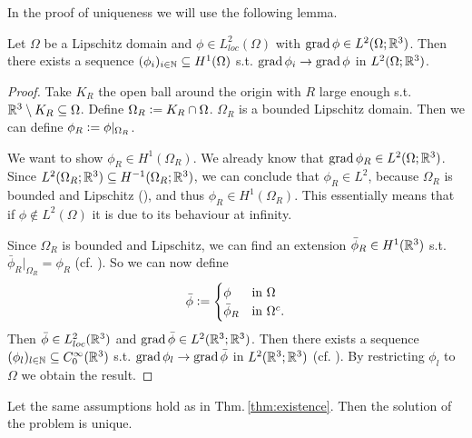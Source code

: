 \documentclass[../master_thesis.tex]{subfiles}
\begin{document}
In the proof of uniqueness we will use the following lemma. 
\begin{lemma}\label{lem:gradient_sequence}
    Let $\Omega$ be a Lipschitz domain and $\phi \in L^2_{loc}(\Omega)$ 
    with $\operatorname{grad} \phi \in L^2(\Omega;\mathbb{R}^3)$. Then 
    there exists a sequence $(\phi_i)_{i \in \mathbb{N}} \subseteq H^1(\Omega)$
    s.t. $\operatorname{grad} \phi_i \rightarrow \operatorname{grad} \phi$ in $L^2(\Omega;\mathbb{R}^3)$.
\end{lemma}
\begin{proof}
    Take $K_R$ the open ball around the origin with $R$ large enough 
    s.t. $\mathbb{R}^3 \setminus K_R \subseteq \Omega$. 
    Define $\Omega_R \vcentcolon= K_R \cap \Omega$. $\Omega_R$ is a bounded Lipschitz 
    domain.
    Then we can define $\phi_R \vcentcolon= \phi|_{\Omega_R}$.

    We want to show $\phi_R \in H^1(\Omega_R)$. We already know that $\operatorname{grad} \phi_R \in L^2(\Omega; \mathbb{R}^3)$.
    Since $L^2(\Omega_R; \mathbb{R}^3) \subseteq H^{-1}(\Omega_R;\mathbb{R}^3)$, we can conclude that 
    $\phi_R \in L^2$, because $\Omega_R$ is bounded and Lipschitz (\cite[Lemma 3.11]{monk}), 
    and thus $\phi_R \in H^1(\Omega_R)$. This essentially means that 
    if $\phi \notin L^2(\Omega)$ it is due to its behaviour at infinity.

    Since $\Omega_R$ is bounded and Lipschitz, we can find an extension $\bar{\phi}_R \in H^1(\mathbb{R}^3)$ 
    s.t. $\bar{\phi}_R|_{\Omega_R} =\phi_R$ (cf. \cite[Sec.\,1.5.1]{mazya}).
    So we can now define
    \begin{align*}
    \bar{\phi} \vcentcolon=
    \begin{cases}
        \phi & \mbox{in $\Omega$}\\
        \bar{\phi}_R & \mbox{in $\Omega^c$.}\\
    \end{cases}
    \end{align*}
    Then $\bar{\phi} \in L^2_{loc}(\mathbb{R}^3)$ and 
    $\operatorname{grad} \bar{\phi} \in L^2(\mathbb{R}^3;\mathbb{R}^3)$. 
    Then there exists a sequence 
    $(\phi_l) _{l \in \mathbb{N}} \subseteq C^\infty_0(\mathbb{R}^3)$ s.t.
    $\operatorname{grad} \phi_l \rightarrow \operatorname{grad} \bar{\phi}$ in $L^2(\mathbb{R}^3;\mathbb{R}^3)$ 
    (cf. \cite[Lemma 1.1]{simader}). By restricting $\phi_l$ to $\Omega$ 
    we obtain the result.
\end{proof}


\begin{theorem}
    Let the same assumptions hold as in Thm.\,\ref{thm:existence}.
    Then the solution of the problem is unique.
\end{theorem}
\end{document}
